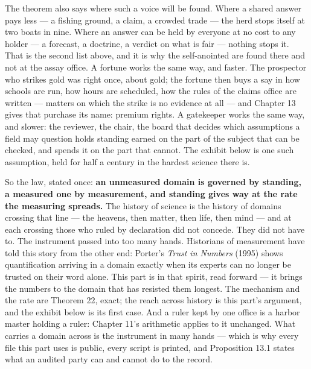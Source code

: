 
The theorem also says where such a voice will be found. Where a shared answer pays less --- a fishing ground, a claim, a
crowded trade --- the herd stops itself at two boats in nine. Where an
answer can be held by everyone at no cost to any holder --- a forecast,
a doctrine, a verdict on what is fair --- nothing stops it. That is the
second list above, and it is why the self-anointed are found there and
not at the assay office. A fortune works the same way, and
faster. The prospector who strikes gold was right once, about gold;
the fortune then buys a say in how schools are run, how hours are
scheduled, how the rules of the claims office are written --- matters on
which the strike is no evidence at all --- and Chapter 13 gives that
purchase its name: premium rights. A gatekeeper works the same way,
and slower: the reviewer, the chair, the board that decides which
assumptions a field may question holds standing earned on the part of
the subject that can be checked, and spends it on the part that
cannot. The exhibit below is one such assumption, held for half a
century in the hardest science there is.

So the law, stated once: \textbf{an unmeasured domain is governed by
standing, a measured one by measurement, and standing gives way at
the rate the measuring spreads.} The history of science is the
history of domains crossing that line --- the heavens, then matter, then
life, then mind --- and at each crossing those who ruled by declaration
did not concede. They did not have to. The instrument passed into too
many hands. Historians of measurement have told this story from the other end: Porter's \emph{Trust in Numbers} (1995) shows quantification arriving in a domain exactly when its experts can no longer be trusted on their word alone. This part is in that spirit, read forward --- it brings the numbers to the domain that has resisted them longest. The mechanism and the rate are Theorem 22, exact; the reach across history is this part's argument, and the exhibit below is its first case. And a ruler kept by one office is a harbor master holding a ruler: Chapter 11's arithmetic applies to it unchanged. What carries a domain across is the instrument in many hands --- which is why every file this part uses is public, every script is printed, and Proposition 13.1 states what an audited party can and cannot do to the record.

